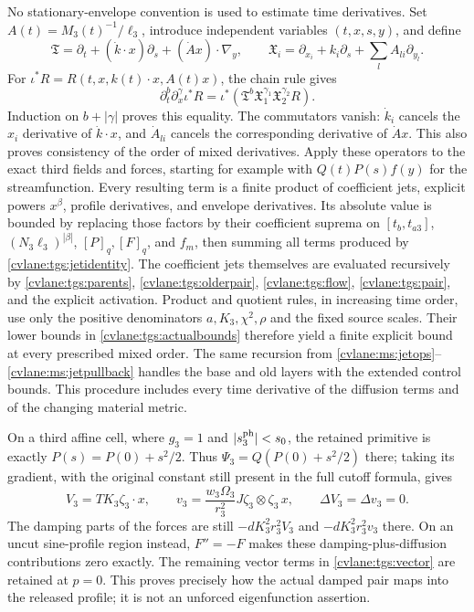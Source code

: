 No stationary-envelope convention is used to estimate time
derivatives. Set $A(t)=M_3(t)^{-1}/\ell_3$, introduce independent
variables $(t,x,s,y)$, and define
\begin{equation}\label{cvlane:tgs:jetoperators}
 \mathfrak T=\partial_t+(\dot k\cdot x)\partial_s
                       +(\dot A x)\cdot\nabla_y,\qquad
 \mathfrak X_i=\partial_{x_i}+k_i\partial_s
                       +\sum_lA_{li}\partial_{y_l}.
\end{equation}
For $\iota^*R=R(t,x,k(t)\cdot x,A(t)x)$, the chain rule gives
\begin{equation}\label{cvlane:tgs:jetidentity}
 \partial_t^b\partial_x^\gamma\iota^*R
   =\iota^*(\mathfrak T^b\mathfrak X_1^{\gamma_1}
                              \mathfrak X_2^{\gamma_2}R).
\end{equation}
Induction on $b+|\gamma|$ proves this equality. The commutators
vanish: $\dot k_i$ cancels the $x_i$ derivative of
$\dot k\cdot x$, and $\dot A_{li}$ cancels the corresponding
derivative of $\dot A x$. This also proves consistency of the
order of mixed derivatives.
Apply these operators to the exact third fields and forces,
starting for example with $Q(t)P(s)f(y)$ for the streamfunction.
Every resulting term is a finite product of coefficient jets,
explicit powers $x^\beta$, profile derivatives, and envelope
derivatives. Its absolute value is bounded by replacing those
factors by their coefficient suprema on $[t_b,t_{a3}]$,
$(N_3\ell_3)^{|\beta|}$, $[P]_q,[F]_q$, and $f_m$,
then summing all terms produced by \eqref{cvlane:tgs:jetidentity}.
The coefficient jets themselves are evaluated recursively by
\eqref{cvlane:tgs:parents}, \eqref{cvlane:tgs:olderpair},
\eqref{cvlane:tgs:flow}, \eqref{cvlane:tgs:pair}, and
the explicit activation. Product and quotient rules, in increasing
time order, use only the positive denominators
$a,K_3,\chi^2,\rho$ and the fixed source scales.
Their lower bounds in \eqref{cvlane:tgs:actualbounds} therefore yield
a finite explicit bound at every prescribed mixed order. The same
recursion from \eqref{cvlane:ms:jetops}--\eqref{cvlane:ms:jetpullback} handles
the base and old layers with the extended control bounds. This
procedure includes every time derivative of the diffusion terms
and of the changing material metric.

On a third affine cell, where $g_3=1$ and $|s_3^{\rm ph}|<s_0$,
the retained primitive is exactly $P(s)=P(0)+s^2/2$. Thus
$\Psi_3=Q(P(0)+s^2/2)$ there; taking its gradient, with the
original constant still present in the full cutoff formula, gives
\begin{equation}\label{cvlane:tgs:affinecell}
 V_3=T K_3\zeta_3\cdot x,\qquad
 v_3=\frac{w_3\Omega_3}{r_3^2}
                  J\zeta_3\otimes\zeta_3\,x,
 \qquad\Delta V_3=\Delta v_3=0.
\end{equation}
The damping parts of the forces are still
$-dK_3^2r_3^2 V_3$ and $-dK_3^2r_3^2 v_3$ there.
On an uncut sine-profile region instead, $F''=-F$ makes these
damping-plus-diffusion contributions zero exactly. The remaining
vector terms in \eqref{cvlane:tgs:vector} are retained at $p=0$.
This proves precisely how the actual damped pair maps into the
released profile; it is not an unforced eigenfunction assertion.

